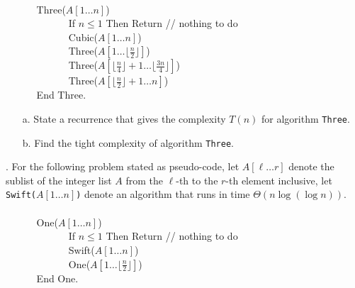 \documentclass[12pt]{article}
\begin{document}
{\ttfamily
$\phantom{A}$\\
$\phantom{---}$ Three($A[1\dots n]$)\\
$\phantom{--- ---}$ If $n \leq 1$ Then Return // nothing to do\\
$\phantom{--- ---}$ Cubic($A[1\dots n]$)\\
$\phantom{--- ---}$ Three($A[1\dots\lfloor\frac{n}{2}\rfloor]$)\\
$\phantom{--- ---}$ Three($A[\lfloor\frac{n}{4}\rfloor+1\dots \lfloor\frac{3n}{4}\rfloor]$)\\
$\phantom{--- ---}$ Three($A[\lfloor\frac{n}{2}\rfloor+1\dots n]$)\\
$\phantom{---}$ End Three.
}

\begin{enumerate}
\item [a.] State a recurrence that gives the complexity $T(n)$ for algorithm \texttt{Three}.

\item [b.] Find the tight complexity of algorithm \texttt{Three}.

\end{enumerate}
\newpage 
{}. For the following problem stated as pseudo-code, let $A[\ell\dots r]$ denote the sublist of the integer list $A$ from the $\ell$-th to the $r$-th element inclusive, let \texttt{Swift($A[1\dots n]$)} denote an algorithm that runs in time $\Theta(n\log(\log n))$.\\
{\ttfamily
$\phantom{A}$\\
$\phantom{---}$ One($A[1\dots n]$)\\
$\phantom{--- ---}$ If $n \leq 1$ Then Return // nothing to do\\
$\phantom{--- ---}$ Swift($A[1\dots n]$)\\
$\phantom{--- ---}$ One($A[1\dots\lfloor\frac{n}{2}\rfloor]$)\\
$\phantom{---}$ End One.
}
\end{document}
